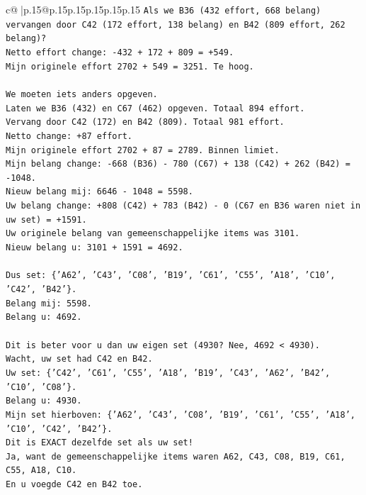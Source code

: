\documentclass{article}
\begin{document}
{\begin{supertabular}{c@{$\;$}|p{.15\linewidth}@{}p{.15\linewidth}p{.15\linewidth}p{.15\linewidth}p{.15\linewidth}p{.15\linewidth}}
{{{\texttt{Als we B36 (432 effort, 668 belang) vervangen door C42 (172 effort, 138 belang) en B42 (809 effort, 262 belang)?} \\
\texttt{Netto effort change: {-}432 + 172 + 809 = +549.} \\
\texttt{Mijn originele effort 2702 + 549 = 3251. Te hoog.} \\
\\ 
\texttt{We moeten iets anders opgeven.} \\
\texttt{Laten we B36 (432) en C67 (462) opgeven. Totaal 894 effort.} \\
\texttt{Vervang door C42 (172) en B42 (809). Totaal 981 effort.} \\
\texttt{Netto change: +87 effort.} \\
\texttt{Mijn originele effort 2702 + 87 = 2789. Binnen limiet.} \\
\texttt{Mijn belang change: {-}668 (B36) {-} 780 (C67) + 138 (C42) + 262 (B42) = {-}1048.} \\
\texttt{Nieuw belang mij: 6646 {-} 1048 = 5598.} \\
\texttt{Uw belang change: +808 (C42) + 783 (B42) {-} 0 (C67 en B36 waren niet in uw set) = +1591.} \\
\texttt{Uw originele belang van gemeenschappelijke items was 3101.} \\
\texttt{Nieuw belang u: 3101 + 1591 = 4692.} \\
\\ 
\texttt{Dus set: \{'A62', 'C43', 'C08', 'B19', 'C61', 'C55', 'A18', 'C10', 'C42', 'B42'\}.} \\
\texttt{Belang mij: 5598.} \\
\texttt{Belang u: 4692.} \\
\\ 
\texttt{Dit is beter voor u dan uw eigen set (4930? Nee, 4692 < 4930).} \\
\texttt{Wacht, uw set had C42 en B42.} \\
\texttt{Uw set: \{'C42', 'C61', 'C55', 'A18', 'B19', 'C43', 'A62', 'B42', 'C10', 'C08'\}.} \\
\texttt{Belang u: 4930.} \\
\texttt{Mijn set hierboven: \{'A62', 'C43', 'C08', 'B19', 'C61', 'C55', 'A18', 'C10', 'C42', 'B42'\}.} \\
\texttt{Dit is EXACT dezelfde set als uw set!} \\
\texttt{Ja, want de gemeenschappelijke items waren A62, C43, C08, B19, C61, C55, A18, C10.} \\
\texttt{En u voegde C42 en B42 toe.} \\
}}}
\end{supertabular}}
\end{document}
